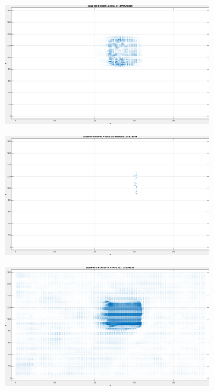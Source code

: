 \begin{figure}[tb]
\centering
\begin{subfigure}{.45\textwidth}
  \centering
  \includegraphics[height=.6\linewidth]{figs/quadrat/quadrat-1.png}
  \caption{}
\end{subfigure}
\begin{subfigure}{.45\textwidth}
  \includegraphics[height=.6\linewidth]{figs/quadrat/quadrat-masked-1.png}
  \caption{}
\end{subfigure}
\begin{subfigure}{.45\textwidth}
  \centering
  \includegraphics[height=.6\linewidth]{figs/quadrat/quadrat-GT-1.png}

\end{subfigure}
\end{figure}
